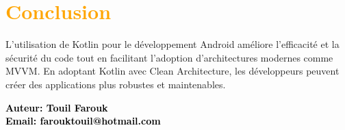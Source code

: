 \section{\textcolor{orange}{Conclusion}}\label{sec:conclusion}
L'utilisation de Kotlin pour le développement Android améliore l'efficacité et la sécurité du code tout en facilitant l'adoption d'architectures modernes comme MVVM. En adoptant Kotlin avec Clean Architecture, les développeurs peuvent créer des applications plus robustes et maintenables.

\begin{center}
\textbf{\textcolor{black}{Auteur: Touil Farouk}} \\  %
\textbf{\textcolor{black}{Email: farouktouil@hotmail.com}}
\end{center}